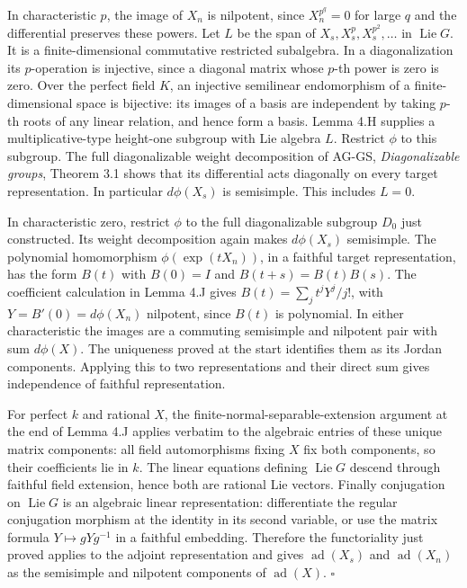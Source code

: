 \documentclass[11pt,a4paper,openany]{report}
\begin{document}
In characteristic \(p\), the image of \(X_n\) is nilpotent, since \(X_n^{p^q}=0\) for large \(q\) and the differential preserves these powers. Let \(L\) be the span of \(X_s,X_s^p,X_s^{p^2},\ldots\) in \(\operatorname{Lie}G\). It is a finite-dimensional commutative restricted subalgebra. In a diagonalization its \(p\)-operation is injective, since a diagonal matrix whose \(p\)-th power is zero is zero. Over the perfect field \(K\), an injective semilinear endomorphism of a finite-dimensional space is bijective: its images of a basis are independent by taking \(p\)-th roots of any linear relation, and hence form a basis. Lemma 4.H supplies a multiplicative-type height-one subgroup with Lie algebra \(L\). Restrict \(\phi\) to this subgroup. The full diagonalizable weight decomposition of AG-GS, \emph{Diagonalizable groups}, Theorem 3.1 shows that its differential acts diagonally on every target representation. In particular \(d\phi(X_s)\) is semisimple. This includes \(L=0\).

In characteristic zero, restrict \(\phi\) to the full diagonalizable subgroup \(D_0\) just constructed. Its weight decomposition again makes \(d\phi(X_s)\) semisimple. The polynomial homomorphism \(\phi(\exp(tX_n))\), in a faithful target representation, has the form \(B(t)\) with \(B(0)=I\) and \(B(t+s)=B(t)B(s)\). The coefficient calculation in Lemma 4.J gives \(B(t)=\sum_j t^jY^j/j!\), with \(Y=B'(0)=d\phi(X_n)\) nilpotent, since \(B(t)\) is polynomial. In either characteristic the images are a commuting semisimple and nilpotent pair with sum \(d\phi(X)\). The uniqueness proved at the start identifies them as its Jordan components. Applying this to two representations and their direct sum gives independence of faithful representation.

For perfect \(k\) and rational \(X\), the finite-normal-separable-extension argument at the end of Lemma 4.J applies verbatim to the algebraic entries of these unique matrix components: all field automorphisms fixing \(X\) fix both components, so their coefficients lie in \(k\). The linear equations defining \(\operatorname{Lie}G\) descend through faithful field extension, hence both are rational Lie vectors. Finally conjugation on \(\operatorname{Lie}G\) is an algebraic linear representation: differentiate the regular conjugation morphism at the identity in its second variable, or use the matrix formula \(Y\mapsto gYg^{-1}\) in a faithful embedding. Therefore the functoriality just proved applies to the adjoint representation and gives \(\operatorname{ad}(X_s)\) and \(\operatorname{ad}(X_n)\) as the semisimple and nilpotent components of \(\operatorname{ad}(X)\). \(\square\)
\end{document}
